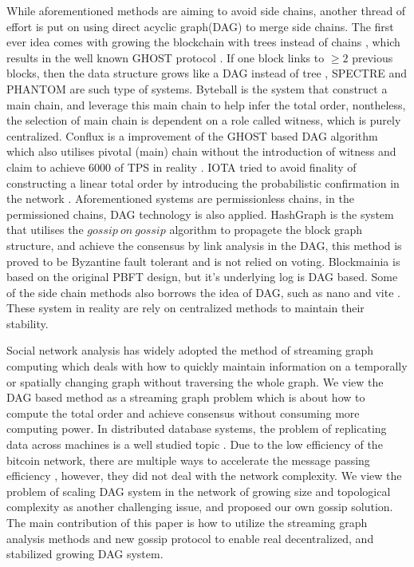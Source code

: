 While aforementioned methods are aiming to avoid side chains, 
another thread of effort is put on using direct acyclic graph(DAG) to merge side chains.
The first ever idea comes with growing the blockchain with trees instead of 
chains \cite{sompolinsky2013accelerating}, which results in the well known GHOST protocol \cite{sompolinsky2015secure}.
If one block links to $\geq 2$ previous blocks, then the data structure grows like a DAG instead of tree \cite{lewenberg2015inclusive}, 
SPECTRE \cite{sompolinsky2016spectre} and PHANTOM \cite{sompolinskyphantom} are such type of systems.
Byteball \cite{churyumov2016byteball} is the system that construct a main chain, 
and leverage this main chain to help infer the total order, nontheless, 
the selection of main chain is dependent on a role called witness, which is purely centralized.
Conflux is a improvement of the GHOST based DAG algorithm which also utilises pivotal (main) chain 
without the introduction of witness and claim to achieve $6000$ of TPS in reality \cite{li2018scaling}.
IOTA tried to avoid finality of constructing a linear total order by introducing the probabilistic confirmation in the network \cite{popov2016tangle}. 
Aforementioned systems are permissionless chains, in the permissioned chains, DAG technology is also applied. 
HashGraph \cite{baird2016swirlds} is the system that utilises the $gossip\ on\ gossip$ algorithm to propagete the block graph structure, and achieve the
consensus by link analysis in the DAG, this method is proved to be Byzantine fault tolerant and is not relied on voting.
Blockmainia \cite{danezis2018blockmania} is based on the original PBFT design, but it's underlying log is DAG based.
Some of the side chain methods also borrows the idea of DAG, such as nano \cite{lemahieu2018nano} and vite \cite{liuvite}.
These system in reality are rely on centralized methods to maintain their stability.

Social network analysis has widely adopted the method of streaming graph computing \cite{ediger2011tracking, green2012fast, ediger2012stinger} which deals
with how to quickly maintain information on a temporally or spatially changing graph without traversing the whole graph. 
We view the DAG based method as a streaming graph problem which is about how to compute the total order and achieve consensus without consuming more computing power.
In distributed database systems, the problem of replicating data across machines is a well studied topic \cite{demers1988epidemic}.
Due to the low efficiency of the bitcoin network, there are multiple ways to accelerate the message passing efficiency \cite{klarmanbloxroute}, however, they did not deal with the network complexity. 
We view the problem of scaling DAG system in the network of growing size and topological complexity as another challenging issue, and proposed our own gossip solution.
The main contribution of this paper is how to utilize the streaming graph analysis methods and new gossip protocol to enable real decentralized, and stabilized growing DAG system.
